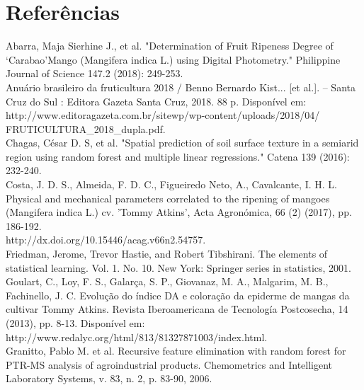 \newpage

\section{Referências}


\noindent Abarra, Maja Sierhine J., et al. "Determination of Fruit Ripeness Degree of ‘Carabao’Mango (Mangifera indica L.) using Digital Photometry." Philippine Journal of Science 147.2 (2018): 249-253.
\\

\noindent Anuário brasileiro da fruticultura 2018 / Benno Bernardo Kist... [et al.]. – Santa Cruz do Sul : Editora Gazeta Santa Cruz, 2018. 88 p. Disponível em: \\ http://www.editoragazeta.com.br/sitewp/wp-content/uploads/2018/04/ \\
FRUTICULTURA\_2018\_dupla.pdf.
\\

\noindent Chagas, César D. S, et al. "Spatial prediction of soil surface texture in a semiarid region using random forest and multiple linear regressions." Catena 139 (2016): 232-240.
\\

\noindent Costa, J. D. S., Almeida, F. D. C., Figueiredo Neto, A., Cavalcante, I. H. L. Physical and mechanical parameters correlated to the ripening of mangoes (Mangifera indica L.) cv. 'Tommy Atkins', Acta Agronómica, 66 (2) (2017), pp. 186-192. \\
http://dx.doi.org/10.15446/acag.v66n2.54757.
\\

\noindent Friedman, Jerome, Trevor Hastie, and Robert Tibshirani. The elements of statistical learning. Vol. 1. No. 10. New York: Springer series in statistics, 2001.
\\

\noindent Goulart, C., Loy, F. S., Galarça, S. P., Giovanaz, M. A., Malgarim, M. B., Fachinello, J. C. Evolução do índice DA e coloração da epiderme de mangas da cultivar Tommy Atkins. Revista Iberoamericana de Tecnología Postcosecha, 14 (2013), pp. 8-13. Disponível em: http://www.redalyc.org/html/813/81327871003/index.html.
\\

\noindent Granitto, Pablo M. et al. Recursive feature elimination with random forest for PTR-MS analysis of agroindustrial products. Chemometrics and Intelligent Laboratory Systems, v. 83, n. 2, p. 83-90, 2006.
\\

